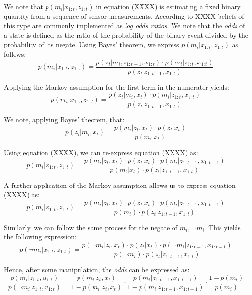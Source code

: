 \documentclass[a4paper]{article}
\begin{document}
We note that $p(m_i | x_{1:t}, z_{1:t})$ in equation (XXXX) is estimating a fixed binary quantity from a sequence of sensor measurements. According to XXXX beliefs of this type are commonly implemented as \textit{log odds ratios}. We note that the \textit{odds} of a state is defined as the ratio of the probability of the binary event divided by the probability of its negate. Using Bayes' theorem, we express $p(m_i | x_{1:t}, z_{1:t})$ as follows:
\begin{equation}
p(m_i | x_{1:t}, z_{1:t}) = \frac{p(z_t | m_i, z_{1:t-1}, x_{1:t}) \cdot p(m_i | z_{1:t}, x_{1:t})}{p(z_t | z_{1:t-1}, x_{1:t})}
\end{equation}

Applying the Markov assumption for the first term in the numerator yields:
\begin{equation}
p(m_i | x_{1:t}, z_{1:t}) = \frac{p(z_t | m_i, x_{t}) \cdot p(m_i | z_{1:t}, x_{1:t})}{p(z_t | z_{1:t-1}, x_{1:t})}
\end{equation}

We note, applying Bayes' theorem, that:
\begin{equation}
p(z_t | m_i, x_t) = \frac{p(m_i | z_t, x_t) \cdot p(z_t | x_t)}{p(m_i | x_t)}
\end{equation}

Using equation (XXXX), we can re-express equation (XXXX) as:
\begin{equation}
p(m_i | x_{1:t}, z_{1:t}) = \frac{p(m_i | z_t, x_t) \cdot p(z_t | x_t) \cdot p(m_i | z_{1:t-1}, x_{1:t-1})}{p(m_i | x_t) \cdot p(z_t | z_{1:t-1}, x_{1:t})}
\end{equation}

A further application of the Markov assumption allows us to express equation (XXXX) as:
\begin{equation}
p(m_i | x_{1:t}, z_{1:t}) = \frac{p(m_i | z_t, x_t) \cdot p(z_t | x_t) \cdot p(m_i | z_{1:t-1}, x_{1:t-1})}{p(m_i) \cdot p(z_t | z_{1:t-1}, x_{1:t})}
\end{equation}

Similarly, we can follow the same process for the negate of $m_i$, $\neg m_i$. This yields the following expression:
\begin{equation}
p(\neg m_i | x_{1:t}, z_{1:t}) = \frac{p(\neg m_i | z_t, x_t) \cdot p(z_t | x_t) \cdot p(\neg m_i | z_{1:t-1}, x_{1:t-1})}{p( \neg m_i) \cdot p(z_t | z_{1:t-1}, x_{1:t})}
\end{equation}

Hence, after some manipulation, the \textit{odds} can be expressed as:
\begin{equation}
\frac{p(m_i | z_{1:t}, u_{1:t})}{p( \neg m_i | z_{1:t}, u_{1:t})} = \frac{p(m_i | z_t, x_t)}{1 - p(m_i | z_t, x_t)} \cdot \frac{p(m_i | z_{1:t-1}, x_{1:t-1})}{1 - p(m_i | z_{1:t-1}, x_{1:t-1})} \cdot \frac{1 - p(m_i)}{p(m_i)}
\end{equation}
\end{document}
